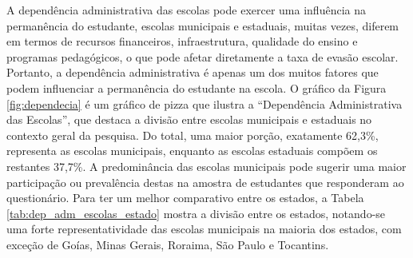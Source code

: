 A dependência administrativa das escolas pode exercer uma influência na permanência do estudante, escolas municipais e estaduais, muitas vezes, diferem em termos de recursos financeiros, infraestrutura, qualidade do ensino e programas pedagógicos, o que pode afetar diretamente a taxa de evasão escolar. Portanto, a dependência administrativa é apenas um dos muitos fatores que podem influenciar a permanência do estudante na escola. O gráfico da Figura \ref{fig:dependecia} é um gráfico de pizza que ilustra a ``Dependência Administrativa das Escolas'', que destaca a divisão entre escolas municipais e estaduais no contexto geral da pesquisa. Do total, uma maior porção, exatamente 62,3\%, representa as escolas municipais, enquanto as escolas estaduais compõem os restantes 37,7\%. A predominância das escolas municipais pode sugerir uma maior participação ou prevalência destas na amostra de estudantes que responderam ao questionário. Para ter um melhor comparativo entre os estados, a Tabela \ref{tab:dep_adm_escolas_estado} mostra a divisão entre os estados, notando-se uma forte representatividade das escolas municipais na maioria dos estados, com exceção de Goías, Minas Gerais, Roraima, São Paulo e Tocantins.






